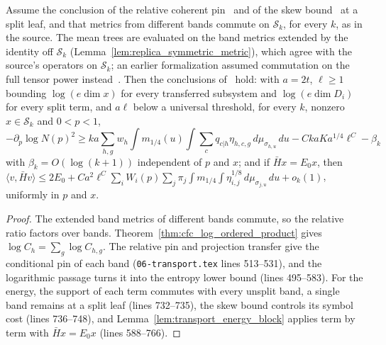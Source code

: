 \begin{theorem}
    \label{thm:replica_transport_conditional}
    \leanok
    Assume the conclusion of the relative coherent pin~\cite[Lemma~6.3]{OpenAI2026AreaLaw}
    and of the skew bound~\cite[Lemma~6.4]{OpenAI2026AreaLaw} at a split leaf, and that
    metrics from different bands commute on $\mathcal S_k$, for every $k$, as in the
    source. The mean trees are evaluated on the band metrics extended by the identity off
    $\mathcal S_k$ (Lemma~\ref{lem:replica_symmetric_metric}), which agree with the
    source's operators on $\mathcal S_k$; an earlier formalization assumed commutation on
    the full tensor power instead~\cite{gap:oai26_transport_crossband_commutation}.
    Then the conclusions of~\cite[Proposition~7.4]{OpenAI2026AreaLaw} hold: with
    $a=2t$, $\ell\ge1$ bounding $\log(e\dim x)$ for every transferred subsystem and
    $\log(e\dim D_i)$ for every split term, and $a\ell$ below a universal
    threshold, for every $k$, nonzero $x\in\mathcal S_k$ and $0<p<1$,
    \[
      -\partial_p\log N(p)^2\ge ka\sum_{h,g}w_h\int m_{1/4}(u)\int\sum_cq_{c|h}
      \eta_{h,c,g}\,d\mu_{\sigma_{h,u}}\,du-CkaKa^{1/4}\ell^C-\beta_k
    \]
    with $\beta_k=O(\log(k+1))$ independent of $p$ and $x$; and if
    $\bar Hx=E_0x$, then
    $\langle v,\bar Hv\rangle\le2E_0+Ca^2\ell^C\sum_iW_i(p)\sum_{j}\pi_j\int
    m_{1/4}\int\eta_{i,j}^{1/8}\,d\mu_{\sigma_{j,u}}\,du+o_k(1)$, uniformly in $p$
    and $x$.
\end{theorem}

\begin{proof}\leanok
    The extended band metrics of different bands commute, so the relative ratio factors
    over bands. Theorem~\ref{thm:cfc_log_ordered_product} gives
    $\log C_h=\sum_g\log C_{h,g}$. The
    relative pin and projection transfer give the conditional pin of each band
    (\texttt{06-transport.tex} lines 513--531), and the logarithmic passage turns
    it into the entropy lower bound (lines 495--583). For the energy, the
    support of each term commutes with every unsplit band, a single band remains
    at a split leaf (lines 732--735), the skew bound controls its symbol cost
    (lines 736--748), and Lemma~\ref{lem:transport_energy_block} applies term by
    term with $\bar Hx=E_0x$ (lines 588--766).
\end{proof}

